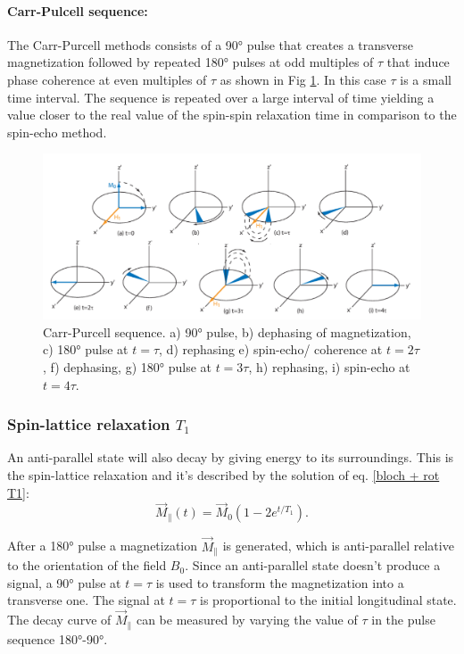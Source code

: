 \paragraph{Carr-Pulcell sequence: }
The Carr-Purcell methods consists of a 90° pulse that creates a transverse magnetization followed by repeated 180° pulses at odd multiples of $\tau$ that induce phase coherence at even multiples of $\tau$ as shown in Fig \ref{fig: carr-purcell sequence}. In this case $\tau$ is a small time interval. 
The sequence is repeated over a large interval of time yielding a value closer to the real value of the spin-spin relaxation time in comparison to the spin-echo method.
\begin{figure}[!htbp]
 \begin{center}
  \includegraphics[width=.6\textwidth]{Latex images/carr-purcell-sequence2.jpg} 
  \caption[]{ Carr-Purcell sequence. a) 90° pulse, b) dephasing of magnetization, c) 180° pulse at $t = \tau$, d) rephasing e) spin-echo/ coherence at $t = 2\tau$, f) dephasing, g) 180° pulse at $t = 3 \tau$, h) rephasing, i) spin-echo at $t = 4\tau$.  \footnotemark}
  \label{fig: carr-purcell sequence}
 \end{center}
\end{figure}

\subsubsection{Spin-lattice relaxation $T_1$}
An anti-parallel state will also decay by giving energy to its surroundings. This is the spin-lattice relaxation and it's described by  the solution of eq. \ref{bloch + rot T1}:
\begin{equation}
\label{eq: sol. bloch T1}
\vec{M}_\parallel(t) = \vec{M}_0\left( 1 - 2e^{t/T_1}\right).
\end{equation}

After a 180° pulse a magnetization $\vec{M}_\parallel$ is generated, which is anti-parallel relative to the orientation of the field $B_0$. Since an anti-parallel state doesn't produce a signal, a 90° pulse at $t = \tau$ is used to transform the magnetization into a transverse one. The signal at $t = \tau$ is proportional to the initial longitudinal state. The decay curve of $\vec{M}_\parallel$ can be measured by varying the value of $\tau$ in the pulse sequence 180°-90°. 
